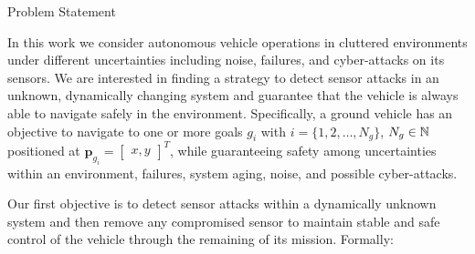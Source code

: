 \begin{section}{Problem Statement}
	
\label{sec:problem}

In this work we consider autonomous vehicle operations in cluttered environments under different uncertainties including noise, failures, and cyber-attacks on its sensors. 
We are interested in finding a strategy to detect sensor attacks in an unknown, dynamically changing system and guarantee that the vehicle is always able to navigate safely in the environment. Specifically, a ground vehicle has an objective to navigate to one or more goals $g_i$ with $ i = \{1, 2, \dots, N_g\}$, $N_g \in \mathbb{N}$ positioned at $\bm{p}_{g_i}={\begin{bmatrix} x,y \end{bmatrix}}^T$, while guaranteeing safety among uncertainties within an environment, failures, system aging, noise, and possible cyber-attacks.





Our first objective is to detect sensor attacks within a dynamically unknown system and then remove any compromised sensor to maintain stable and safe control of the vehicle through the remaining of its mission. Formally:


\end{section}
